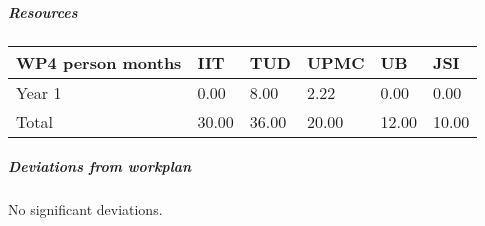 
\subparagraph{Resources}

\begin{center}
\begin{tabular}{|C{1.5cm}|C{1.5cm}|C{1.5cm}|C{2cm}|C{2cm}|C{2cm}|}
\hline
\footnotesize \textbf{WP4 person months}& \footnotesize \textbf{IIT}&\footnotesize \textbf{TUD}&\footnotesize \textbf{UPMC}& \footnotesize \textbf{UB} &\footnotesize \textbf{JSI}\\ \hline
\footnotesize Year 1 &  0.00 & 8.00 & 2.22 & 0.00 & 0.00      \\  \hline
\footnotesize Total &  30.00 & 36.00 & 20.00 & 12.00 & 10.00 \\ \hline
\end{tabular}
\end{center}

\subparagraph{Deviations from workplan} 
No significant deviations. 
